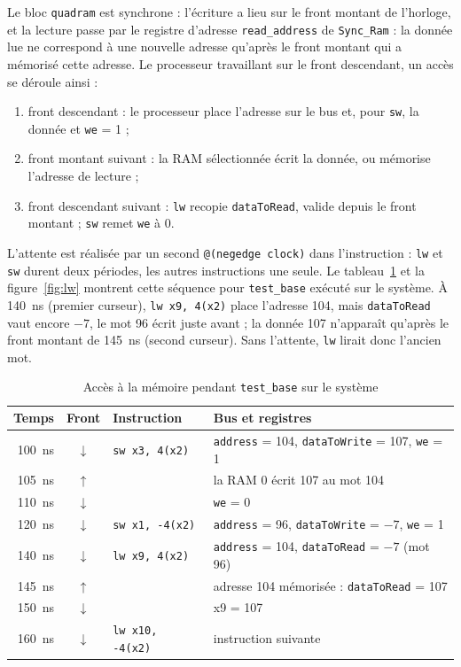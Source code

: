 Le bloc \texttt{quadram} est synchrone : l'écriture a lieu sur le front montant de l'horloge, et
la lecture passe par le registre d'adresse \texttt{read\_address} de \texttt{Sync\_Ram} : la donnée
lue ne correspond à une nouvelle adresse qu'après le front montant qui a mémorisé cette adresse.
Le processeur travaillant sur le front descendant, un accès se déroule ainsi :
\begin{enumerate}
\item front descendant : le processeur place l'adresse sur le bus et, pour \texttt{sw}, la donnée
et \texttt{we} = 1 ;
\item front montant suivant : la RAM sélectionnée écrit la donnée, ou mémorise l'adresse de
lecture ;
\item front descendant suivant : \texttt{lw} recopie \texttt{dataToRead}, valide depuis le front
montant ; \texttt{sw} remet \texttt{we} à 0.
\end{enumerate}

L'attente est réalisée par un second \lstinline[style=vlinline]|@(negedge clock)| dans
l'instruction : \texttt{lw} et \texttt{sw} durent deux périodes, les autres instructions une
seule. Le tableau~\ref{tab:chrono} et la figure~\ref{fig:lw} montrent cette séquence pour
\texttt{test\_base} exécuté sur le système. À 140~ns (premier curseur), \texttt{lw x9, 4(x2)}
place l'adresse 104, mais \texttt{dataToRead} vaut encore $-7$, le mot 96 écrit juste avant ; la
donnée 107 n'apparaît qu'après le front montant de 145~ns (second curseur). Sans l'attente,
\texttt{lw} lirait donc l'ancien mot.

\begin{table}[H]
\centering
\begin{tabular}{rcll}
\toprule
Temps & Front & Instruction & Bus et registres \\
\midrule
100~ns & $\downarrow$ & \texttt{sw x3, 4(x2)}  & \texttt{address} = 104, \texttt{dataToWrite} = 107, \texttt{we} = 1 \\
105~ns & $\uparrow$   &                        & la RAM 0 écrit 107 au mot 104 \\
110~ns & $\downarrow$ &                        & \texttt{we} = 0 \\
120~ns & $\downarrow$ & \texttt{sw x1, -4(x2)} & \texttt{address} = 96, \texttt{dataToWrite} = $-7$, \texttt{we} = 1 \\
140~ns & $\downarrow$ & \texttt{lw x9, 4(x2)}  & \texttt{address} = 104, \texttt{dataToRead} = $-7$ (mot 96) \\
145~ns & $\uparrow$   &                        & adresse 104 mémorisée : \texttt{dataToRead} = 107 \\
150~ns & $\downarrow$ &                        & x9 = 107 \\
160~ns & $\downarrow$ & \texttt{lw x10, -4(x2)} & instruction suivante \\
\bottomrule
\end{tabular}
\caption{Accès à la mémoire pendant \texttt{test\_base} sur le système}
\label{tab:chrono}
\end{table}

